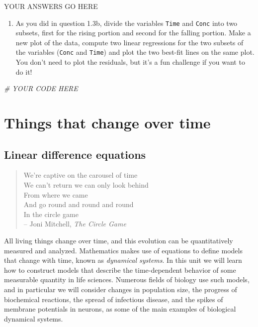 \documentclass[
]{book}
\newenvironment{Shaded}{\begin{snugshade}}{\end{snugshade}}
\newcommand{\CommentTok}[1]{\textcolor[rgb]{0.56,0.35,0.01}{\textit{#1}}}
\providecommand{\tightlist}{%
  \setlength{\itemsep}{0pt}\setlength{\parskip}{0pt}}
\theoremstyle{definition}
\theoremstyle{definition}
\theoremstyle{definition}
\theoremstyle{remark}
\begin{document}
YOUR ANSWERS GO HERE

\begin{enumerate}
\def\labelenumi{\alph{enumi})}
\setcounter{enumi}{1}
\tightlist
\item
  As you did in question 1.3b, divide the variables \texttt{Time} and \texttt{Conc} into two subsets, first for the rising portion and second for the falling portion. Make a new plot of the data, compute two linear regressions for the two subsets of the variables (\texttt{Conc} and \texttt{Time}) and plot the two best-fit lines on the same plot. You don't need to plot the residuals, but it's a fun challenge if you want to do it!
\end{enumerate}

\begin{Shaded}
\begin{Highlighting}[]
\CommentTok{\# YOUR CODE HERE}
\end{Highlighting}
\end{Shaded}

\hypertarget{part-things-that-change-over-time}{%
\part{Things that change over time}\label{part-things-that-change-over-time}}

\hypertarget{linear-difference-equations}{%
\chapter{Linear difference equations}\label{linear-difference-equations}}


\begin{quote}
We're captive on the carousel of time\\
We can't return we can only look behind\\
From where we came\\
And go round and round and round\\
In the circle game\\
-- Joni Mitchell, \emph{The Circle Game}
\end{quote}

All living things change over time, and this evolution can be quantitatively measured and analyzed. Mathematics makes use of equations to define models that change with time, known as  \emph{dynamical systems}. In this unit we will learn how to construct models that describe the time-dependent behavior of some measurable quantity in life sciences. Numerous fields of biology use such models, and in particular we will consider changes in population size, the progress of biochemical reactions, the spread of infectious disease, and the spikes of membrane potentials in neurons, as some of the main examples of biological dynamical systems.
\end{document}

